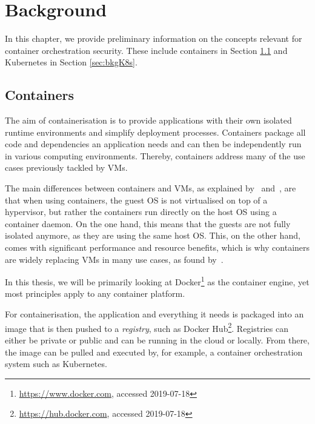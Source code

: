 
\chapter{Background} \label{cha:background}

In this chapter, we provide preliminary information on the concepts relevant for container orchestration security. These include containers in Section \ref{sec:bkgContainers} and Kubernetes in Section \ref{sec:bkgK8s}.

\section{Containers} \label{sec:bkgContainers}

The aim of containerisation is to provide applications with their own isolated runtime environments and simplify deployment processes. Containers package all code and dependencies an application needs and can then be independently run in various computing environments. Thereby, containers address many of the use cases previously tackled by \acp{VM}. 

The main differences between containers and \acp{VM}, as explained by~\textcite{containersVsVMs} and~\textcite{containersVsVMsComparison}, are that when using containers, the guest OS is not virtualised on top of a hypervisor, but rather the containers run directly on the host OS using a container daemon. On the one hand, this means that the guests are not fully isolated anymore, as they are using the same host OS. This, on the other hand, comes with significant performance and resource benefits, which is why containers are widely replacing \acp{VM} in many use cases, as found by~\textcite{redhatOutlook}.

In this thesis, we will be primarily looking at Docker\footnote{\url{https://www.docker.com}, accessed 2019-07-18} as the container engine, yet most principles apply to any container platform.

For containerisation, the application and everything it needs is packaged into an image that is then pushed to a \textit{registry}, such as Docker Hub\footnote{\url{https://hub.docker.com}, accessed 2019-07-18}. Registries can either be private or public and can be running in the cloud or locally. From there, the image can be pulled and executed by, for example, a container orchestration system such as Kubernetes. 

